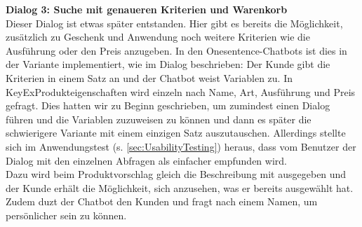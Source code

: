\Large\textbf{Dialog 3: Suche mit genaueren Kriterien und Warenkorb}\\
\normalsize
Dieser Dialog ist etwas später entstanden. Hier gibt es bereits die Möglichkeit, zusätzlich zu Geschenk und Anwendung noch weitere Kriterien wie die Ausführung oder den Preis anzugeben. In den Onesentence-Chatbots ist dies in der Variante implementiert, wie im Dialog beschrieben: Der Kunde gibt die Kriterien in einem Satz an und der Chatbot weist Variablen zu. In KeyExProdukteigenschaften wird einzeln nach Name, Art, Ausführung und Preis gefragt. Dies hatten wir zu Beginn geschrieben, um zumindest einen Dialog führen und die Variablen zuzuweisen zu können und dann es später die schwierigere Variante mit einem einzigen Satz auszutauschen. Allerdings stellte sich im Anwendungstest \textcolor[rgb]{1,0,0}{(s. \ref{sec:UsabilityTesting})} heraus, dass vom Benutzer der Dialog mit den einzelnen Abfragen als einfacher empfunden wird.\\
Dazu wird beim Produktvorschlag gleich die Beschreibung mit ausgegeben und der Kunde erhält die Möglichkeit, sich anzusehen, was er bereits ausgewählt hat.\\
Zudem duzt der Chatbot den Kunden und fragt nach einem Namen, um persönlicher sein zu können.
\vspace{8pt}
